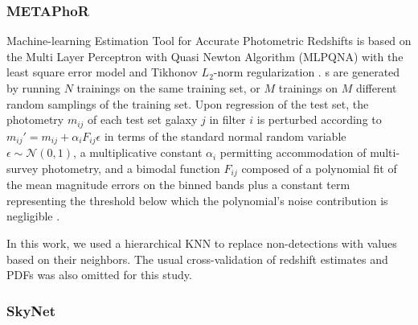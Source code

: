 \subsubsection{METAPhoR}
\label{sec:metaphor}

Machine-learning Estimation Tool for Accurate Photometric Redshifts \citep[\metaphor,][]{Cavuoti:17} is based on the Multi Layer Perceptron with Quasi Newton Algorithm (MLPQNA) with the least square error model and Tikhonov $L_{2}$-norm regularization \citep{Hofmann:18}.
\Pzpdf s are generated by running $N$ trainings on the same training set, or $M$ trainings on $M$ different random samplings of the training set.
Upon regression of the test set, the photometry $m_{ij}$ of each test set galaxy $j$ in filter $i$ is perturbed according to $m_{ij}' = m_{ij} + \alpha_{i} F_{ij} \epsilon$ in terms of the standard normal random variable $\epsilon \sim \mathcal{N}(0, 1)$, a multiplicative constant $\alpha_{i}$ permitting accommodation of multi-survey photometry, and a bimodal function $F_{ij}$ composed of a polynomial fit of the mean magnitude errors on the binned bands plus a constant term representing the threshold below which the polynomial's noise contribution is negligible \citep{Brescia:18}.

In this work, we used a hierarchical KNN to replace non-detections with values based on their neighbors.
The usual cross-validation of redshift estimates and PDFs was also omitted for this study.

\subsubsection{SkyNet}
\label{sec:skynet}

